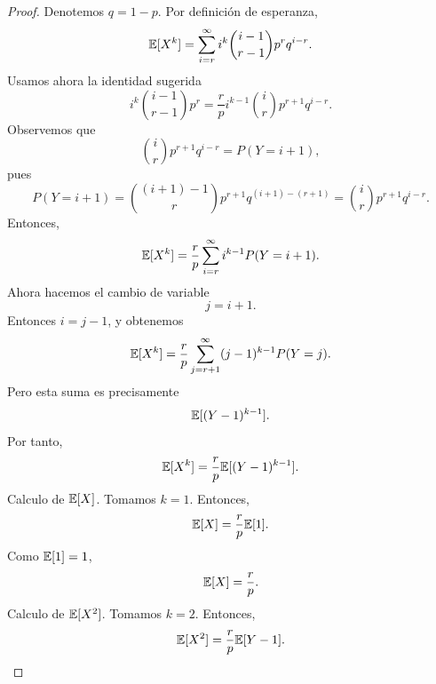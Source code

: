 \documentclass[12pt,a4paper]{article}
\begin{document}
    \begin{proof}
        Denotemos $q=1-p$. Por definición de esperanza,
        \begin{equation*}
            \mathbb{E}[X^{k}]=\sum_{i=r}^{\infty}i^{k}\binom{i-1}{r-1}p^{r}q^{i-r}.
        \end{equation*}
        Usamos ahora la identidad sugerida
        \begin{equation*}
            i^{k}\binom{i-1}{r-1}p^{r}=\frac{r}{p}i^{k-1}\binom{i}{r}p^{r+1}q^{i-r}.
        \end{equation*}
        Observemos que
        \begin{equation*}
        \binom{i}{r}p^{r+1}q^{i-r}=P(Y=i+1),
        \end{equation*}
        pues
        \begin{equation*}
            P(Y=i+1)=\binom{(i+1)-1}{r}p^{r+1}q^{(i+1)-(r+1)}=\binom{i}{r}p^{r+1}q^{i-r}.
        \end{equation*}
        Entonces,
        \begin{equation*}
            \mathbb{E}[X^{k}]=\frac{r}{p}\sum_{i=r}^{\infty}i^{k-1}P(Y=i+1).
        \end{equation*}
        Ahora hacemos el cambio de variable
        \begin{equation*}
            j=i+1.
        \end{equation*}
        Entonces $i=j-1$, y obtenemos
        \begin{equation*}
            \mathbb{E}[X^{k}]=\frac{r}{p}\sum_{j=r+1}^{\infty}(j-1)^{k-1}P(Y=j).
        \end{equation*}
        Pero esta suma es precisamente
        \begin{equation*}
            \mathbb{E}[(Y-1)^{k-1}].
        \end{equation*}
        Por tanto,
        \begin{equation*}
            \mathbb{E}[X^{k}]=\frac{r}{p}\mathbb{E}[(Y-1)^{k-1}].
        \end{equation*}
        Calculo de $\mathbb{E}[X]$. Tomamos $k=1$. Entonces,
        \begin{equation*}
            \mathbb{E}[X]=\frac{r}{p}\mathbb{E}[1].
        \end{equation*}
        Como $\mathbb{E}[1]=1$,
        \begin{equation*}
            \mathbb{E}[X]=\frac{r}{p}.
        \end{equation*}
        Calculo de $\mathbb{E}[X^{2}]$. Tomamos $k=2$. Entonces,
        \begin{equation*}
            \E[X^{2}]=\frac{r}{p}\E[Y-1].

\end{equation*}
\end{proof}
\end{document}
